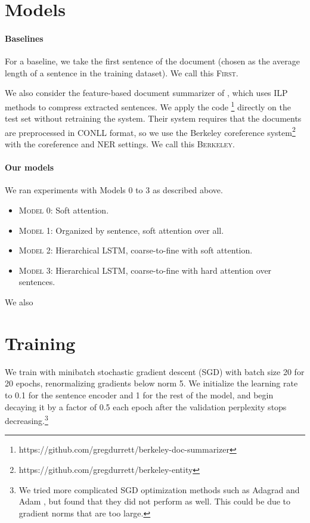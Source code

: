 \documentclass[12pt]{report}
\begin{document}
\section{Models}

\paragraph{Baselines}
For a baseline, we take the first sentence of the document (chosen as the average length of a sentence in the training dataset). We call this \textsc{First}.

We also consider the feature-based document summarizer of \citet{Durrett2016}, which uses ILP methods to compress extracted sentences. We apply the code \footnote{https://github.com/gregdurrett/berkeley-doc-summarizer} directly on the test set without retraining the system. Their system requires that the documents are preprocessed in CONLL format, so we use the Berkeley coreference system\footnote{https://github.com/gregdurrett/berkeley-entity} with the coreference and NER settings. We call this \textsc{Berkeley}.

\paragraph{Our models}

We ran experiments with Models 0 to 3 as described above.

\begin{itemize}
\item \textsc{Model 0}: Soft attention.
\item \textsc{Model 1}: Organized by sentence, soft attention over all.
\item \textsc{Model 2}: Hierarchical LSTM, coarse-to-fine with soft attention.
\item \textsc{Model 3}: Hierarchical LSTM, coarse-to-fine with hard attention over sentences.
\end{itemize}

We also 


\section{Training}

We train with minibatch stochastic gradient descent (SGD) with batch size 20 for 20 epochs, renormalizing gradients below norm 5. We initialize the learning rate to 0.1 for the sentence encoder and 1 for the rest of the model, and begin decaying it by a factor of 0.5 each epoch after the validation perplexity stops decreasing.\footnote{We tried more complicated SGD optimization methods such as Adagrad \citep{Duchi2011} and Adam \citep{Kingma2015}, but found that they did not perform as well. This could be due to gradient norms that are too large.}
\end{document}
